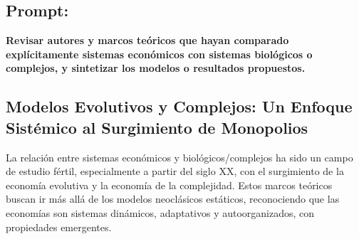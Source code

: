 \documentclass[a4paper,12pt]{article}
\begin{document}
\subsection*{Prompt:}
\textbf{Revisar autores y marcos teóricos que hayan comparado explícitamente sistemas económicos con sistemas biológicos o complejos, y sintetizar los modelos o resultados propuestos.}
\subsection*{Modelos Evolutivos y Complejos: Un Enfoque Sistémico al Surgimiento de Monopolios}

La relación entre sistemas económicos y biológicos/complejos ha sido un campo de estudio fértil, especialmente a partir del siglo XX, con el surgimiento de la economía evolutiva y la economía de la complejidad. Estos marcos teóricos buscan ir más allá de los modelos neoclásicos estáticos, reconociendo que las economías son sistemas dinámicos, adaptativos y autoorganizados, con propiedades emergentes.
\end{document}
